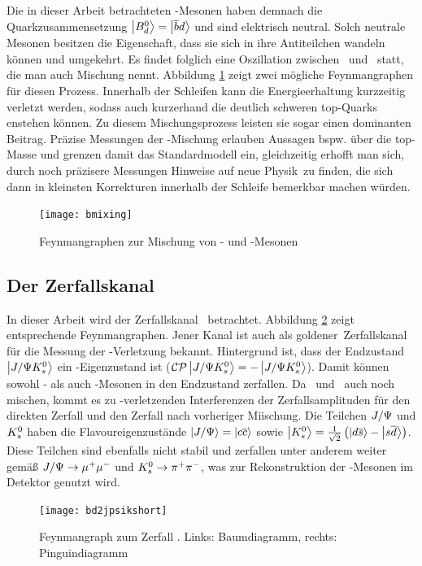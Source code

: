 Die in dieser Arbeit betrachteten \Bd-Mesonen haben demnach die Quarkzusammensetzung $\Ket{\text{$B_d^0$}} = \Ket{\overline{b}d}$ und sind elektrisch neutral. Solch neutrale Mesonen besitzen die Eigenschaft, dass sie sich in ihre Antiteilchen wandeln können und umgekehrt. Es findet folglich eine Oszillation zwischen \Bd\ und \Bdbar\ statt, die man auch Mischung nennt. Abbildung \ref{fig:bmixing} zeigt zwei mögliche Feynmangraphen für diesen Prozess. Innerhalb der Schleifen kann die Energieerhaltung kurzzeitig verletzt werden, sodass auch kurzerhand die deutlich schweren top-Quarks enstehen können. Zu diesem Mischungsprozess leisten sie sogar einen dominanten Beitrag. Präzise Messungen der \Bd-Mischung erlauben Aussagen bspw. über die top-Masse und grenzen damit das Standardmodell ein, gleichzeitig erhofft man sich, durch noch präzisere Messungen Hinweise auf \glqq neue Physik\grqq\ zu finden, die sich dann in kleinsten Korrekturen innerhalb der Schleife bemerkbar machen würden.

\begin{figure}[hptb]
\centering
\texttt{[image: bmixing]}
\caption{Feynmangraphen zur Mischung von \Bd- und \Bdbar-Mesonen}
\label{fig:bmixing}
\end{figure}


\subsection{Der Zerfallskanal \Decaychannel}
In dieser Arbeit wird der Zerfallskanal \Decaychannel\ betrachtet. Abbildung \ref{fig:decay} zeigt entsprechende Feynmangraphen. Jener Kanal ist auch als \glqq goldener\grqq\ Zerfallskanal für die Messung der \CP-Verletzung bekannt. Hintergrund ist, dass der Endzustand $\Ket{J/\Psi K_s^0}$ ein \CP-Eigenzustand ist ($\text{$\mathcal{CP}$}\Ket{J/\Psi K_s^0} = - \Ket{J/\Psi K_s^0}$). Damit können sowohl \Bd- als auch \Bdbar-Mesonen in den Endzustand zerfallen. Da \Bd\ und \Bdbar\ auch noch mischen, kommt es zu \CP-verletzenden Interferenzen der Zerfallsamplituden für den direkten Zerfall und den Zerfall nach vorheriger Miischung. Die Teilchen $J/\Psi$ und $K_s^0$ haben die Flavoureigenzustände $\Ket{J/\Psi} = \Ket{c\overline{c}}$ sowie $\Ket{K_s^0} = \tfrac{1}{\sqrt{2}}\left(\Ket{d\overline{s}}-\Ket{s\overline{d}}\right)$. Diese Teilchen sind ebenfalls nicht stabil und zerfallen unter anderem weiter gemäß $J/\Psi \rightarrow \mu^+\mu^-$ und $K_s^0 \rightarrow \pi^+\pi^-$, was zur Rekonstruktion der \Bd-Mesonen im Detektor genutzt wird.

\begin{figure}[hptb]
\centering
\texttt{[image: bd2jpsikshort]}
\caption{Feynmangraph zum Zerfall \Decaychannel. Links: Baumdiagramm, rechts: Pinguindiagramm}
\label{fig:decay}
\end{figure}

